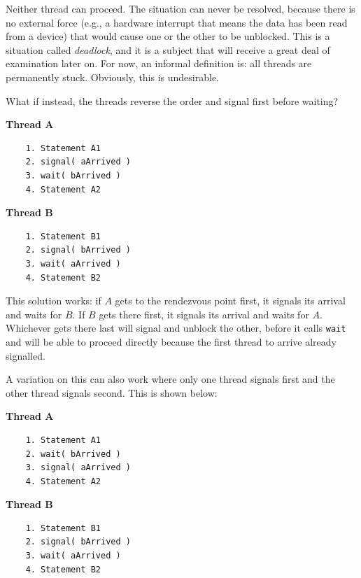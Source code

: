 Neither thread can proceed. The situation can never be resolved, because there is no external force (e.g., a hardware interrupt that means the data has been read from a device) that would cause one or the other to be unblocked. This is a situation called \textit{deadlock}, and it is a subject that will receive a great deal of examination later on. For now, an informal definition is: all threads are permanently stuck. Obviously, this is undesirable.

What if instead, the threads reverse the order and signal first before waiting?

\begin{multicols}{2}
\textbf{Thread A}\vspace{-2em}
  \begin{verbatim}
	1. Statement A1
	2. signal( aArrived )
	3. wait( bArrived )
	4. Statement A2
  \end{verbatim}
\columnbreak
\textbf{Thread B}\vspace{-2em}
  \begin{verbatim}
	1. Statement B1
	2. signal( bArrived )
	3. wait( aArrived )
	4. Statement B2
  \end{verbatim}
\end{multicols}
\vspace{-2em}

This solution works: if $A$ gets to the rendezvous point first, it signals its arrival and waits for $B$. If $B$ gets there first, it signals its arrival and waits for $A$. Whichever gets there last will signal and unblock the other, before it calls \texttt{wait} and will be able to proceed directly because the first thread to arrive already signalled. 

A variation on this can also work where only one thread signals first and the other thread signals second. This is shown below:

\begin{multicols}{2}
\textbf{Thread A}\vspace{-2em}
  \begin{verbatim}
	1. Statement A1
	2. wait( bArrived )
	3. signal( aArrived )
	4. Statement A2
  \end{verbatim}
\columnbreak
\textbf{Thread B}\vspace{-2em}
  \begin{verbatim}
	1. Statement B1
	2. signal( bArrived )
	3. wait( aArrived )
	4. Statement B2
  \end{verbatim}
\end{multicols}
\vspace{-2em}


